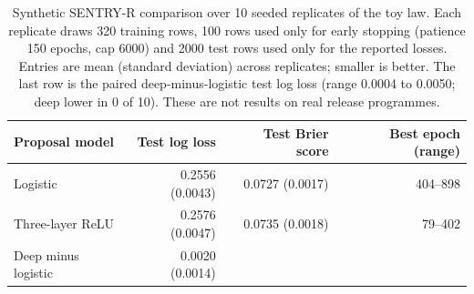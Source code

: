 \begin{table}[H]
\centering
\small
\caption{Synthetic SENTRY-R comparison over 10 seeded replicates of the toy law. Each replicate draws 320 training rows, 100 rows used only for early stopping (patience 150 epochs, cap 6000) and 2000 test rows used only for the reported losses. Entries are mean (standard deviation) across replicates; smaller is better. The last row is the paired deep-minus-logistic test log loss (range 0.0004 to 0.0050; deep lower in 0 of 10). These are not results on real release programmes.}
\label{tab:sentry-synthetic}
\begin{tabular}{lrrr}
\toprule
Proposal model & Test log loss & Test Brier score & Best epoch (range) \\
\midrule
Logistic & 0.2556 (0.0043) & 0.0727 (0.0017) & 404--898 \\
Three-layer ReLU & 0.2576 (0.0047) & 0.0735 (0.0018) & 79--402 \\
\midrule
Deep minus logistic & 0.0020 (0.0014) & & \\
\bottomrule
\end{tabular}
\end{table}
